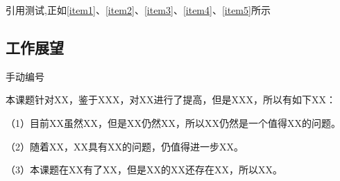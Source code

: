 引用测试,正如\ref{item1}、\ref{item2}、\ref{item3}、\ref{item4}、\ref{item5}所示

\subsection{工作展望}
手动编号 %
\par
本课题针对XX，鉴于XXX，对XX进行了提高，但是XXX，所以有如下XX：

（1）目前XX虽然XX，但是XX仍然XX，所以XX仍然是一个值得XX的问题。

（2）随着XX，XX具有XX的问题，仍值得进一步XX。

（3）本课题在XX有了XX，但是XX的XX还存在XX，所以XX。


\clearpage
